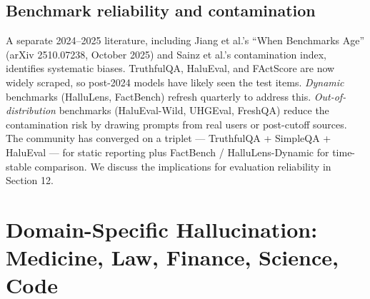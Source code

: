 \subsection{Benchmark reliability and contamination}\label{benchmark-reliability-and-contamination}

A separate 2024--2025 literature, including Jiang et al.'s ``When Benchmarks Age'' (arXiv 2510.07238, October 2025) and Sainz et al.'s contamination index, identifies systematic biases. TruthfulQA, HaluEval, and FActScore are now widely scraped, so post-2024 models have likely seen the test items. \emph{Dynamic} benchmarks (HalluLens, FactBench) refresh quarterly to address this. \emph{Out-of-distribution} benchmarks (HaluEval-Wild, UHGEval, FreshQA) reduce the contamination risk by drawing prompts from real users or post-cutoff sources. The community has converged on a triplet --- TruthfulQA + SimpleQA + HaluEval --- for static reporting plus FactBench / HalluLens-Dynamic for time-stable comparison. We discuss the implications for evaluation reliability in Section 12.

\section{Domain-Specific Hallucination: Medicine, Law, Finance, Science, Code}\label{domain-specific-hallucination-medicine-law-finance-science-code}

